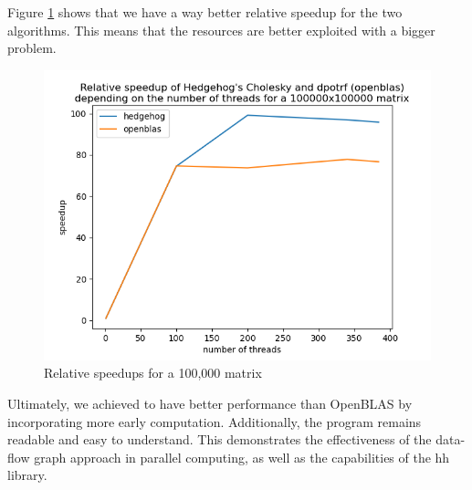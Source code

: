 Figure \ref{fig:relativespeedup100000} shows that we have a way better
relative speedup for the two algorithms. This means that the resources are
better exploited with a bigger problem.

\begin{figure}[!ht]
  \begin{center}
    \includegraphics[scale=0.8]{img/cho-img/relative-speedup-100000.png}
    \caption{Relative speedups for a 100,000 matrix}
    \label{fig:relativespeedup100000}
  \end{center}
\end{figure}

Ultimately, we achieved to have better performance than OpenBLAS by
incorporating more early computation. Additionally, the program remains readable
and easy to understand. This demonstrates the effectiveness of the data-flow
graph approach in parallel computing, as well as the capabilities of the
\gls{hh} library.
